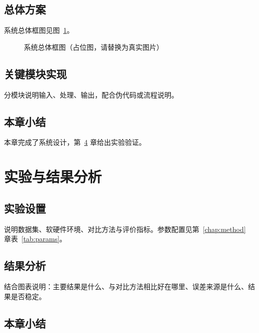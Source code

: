 \documentclass[UTF8,a4paper,zihao=-4,fontset=\swfontset,openany]{ctexbook}
\begin{document}
\section{总体方案}

系统总体框图见图~\ref{fig:framework}。

\begin{figure}[htbp]
  \centering
  \framebox[0.65\textwidth][c]{\rule{0pt}{4cm}}
  \caption{系统总体框图（占位图，请替换为真实图片）}
  \label{fig:framework}
\end{figure}

\section{关键模块实现}

分模块说明输入、处理、输出，配合伪代码或流程说明。

\section{本章小结}

本章完成了系统设计，第~\ref{chap:experiment} 章给出实验验证。

\chapter{实验与结果分析}
\label{chap:experiment}

\section{实验设置}

说明数据集、软硬件环境、对比方法与评价指标。参数配置见第~\ref{chap:method} 章表~\ref{tab:params}。

\section{结果分析}

结合图表说明：主要结果是什么、与对比方法相比好在哪里、误差来源是什么、结果是否稳定。

\section{本章小结}
\end{document}
